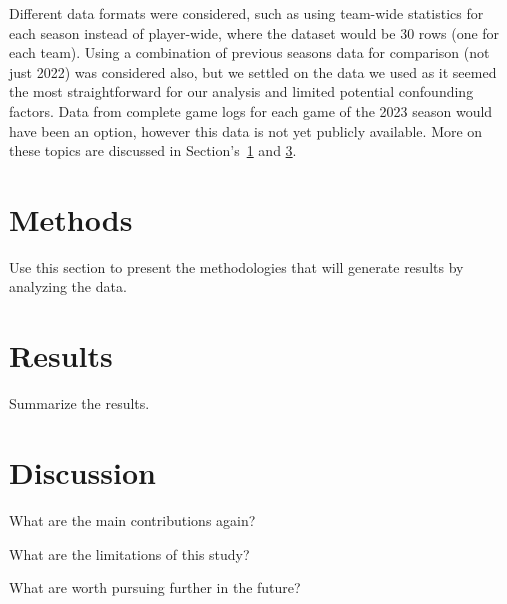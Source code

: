 \documentclass[12pt]{article}
\begin{document}
Different data formats were considered, such as using team-wide statistics
for each season instead of player-wide, where the dataset would be 30 rows (one
for each team). Using a combination of previous seasons data for comparison (not
just 2022) was considered also, but we settled on the data we used as it seemed
the most straightforward for our analysis and limited potential confounding
factors. Data from complete game logs for each game of the 2023 season would have
been an option, however this data is not yet publicly available. More on these topics
are discussed in Section's~\ref{sec:meth} and \ref{sec:disc}.


\section{Methods}
\label{sec:meth}

Use this section to present the methodologies that will generate results by
analyzing the data.


\section{Results}
\label{sec:resu}

Summarize the results.


\section{Discussion}
\label{sec:disc}

What are the main contributions again?

What are the limitations of this study?

What are worth pursuing further in the future?




\end{document}
